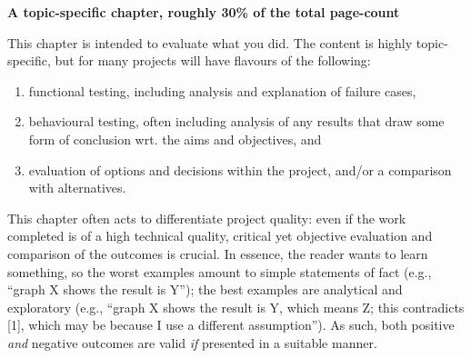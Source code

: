 {\bf A topic-specific chapter, roughly 30\% of the total page-count} 
\vspace{1cm} 

\noindent
This chapter is intended to evaluate what you did.  The content is highly 
topic-specific, but for many projects will have flavours of the following:

\begin{enumerate}
	\item functional  testing, including analysis and explanation of failure 
	      cases,
	\item behavioural testing, often including analysis of any results that 
	      draw some form of conclusion wrt. the aims and objectives,
	      and
	\item evaluation of options and decisions within the project, and/or a
	      comparison with alternatives.
\end{enumerate}

\noindent
This chapter often acts to differentiate project quality: even if the work
completed is of a high technical quality, critical yet objective evaluation 
and comparison of the outcomes is crucial.  In essence, the reader wants to
learn something, so the worst examples amount to simple statements of fact 
(e.g., ``graph X shows the result is Y''); the best examples are analytical 
and exploratory (e.g., ``graph X shows the result is Y, which means Z; this 
contradicts [1], which may be because I use a different assumption'').  As 
such, both positive {\em and}\/ negative outcomes are valid {\em if} presented 
in a suitable manner.


